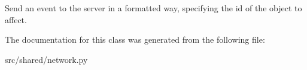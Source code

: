 \begin{DoxyVerb}
Send an event to the server in a formatted way, specifying the id
of the object to affect.
\end{DoxyVerb}
 

\-The documentation for this class was generated from the following file\-:\begin{DoxyCompactItemize}
\item 
src/shared/network.\-py\end{DoxyCompactItemize}
